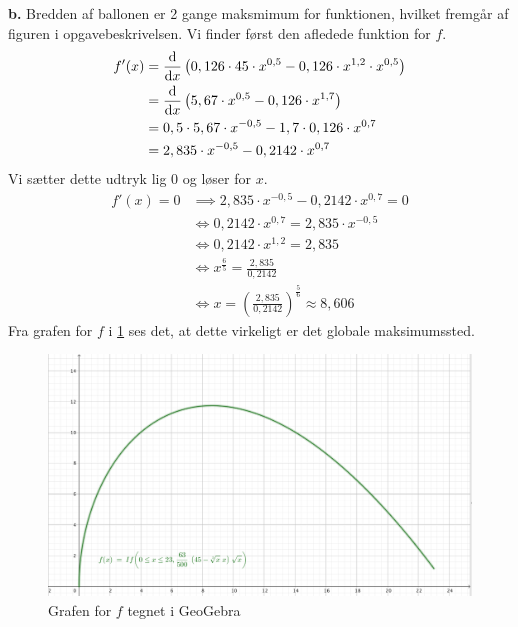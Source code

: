\documentclass{article}
\begin{document}
\noindent \textbf{b.}
Bredden af ballonen er 2 gange maksmimum for funktionen, hvilket fremgår af figuren i opgavebeskrivelsen.
Vi finder først den afledede funktion for $f$. 
\begin{equation*}
\begin{split}
  f'(x)&=\dv{x} \left(0,126 \cdot 45 \cdot x ^{0,5}-0,126 \cdot x ^{1,2} \cdot x ^{0,5}\right) \\
  &=\dv{x} \left(5,67 \cdot x ^{0,5}-0,126 \cdot x ^{1,7}\right) \\
  &=0,5 \cdot 5,67 \cdot x ^{-0,5} - 1,7 \cdot 0,126 \cdot x ^{0,7} \\
  &=2,835 \cdot x ^{-0,5} - 0,2142 \cdot x ^{0,7}
\end{split}
\end{equation*}
Vi sætter dette udtryk lig 0 og løser for $x$.
\begin{equation*}
\begin{split}
  f'(x)= 0 &\implies 2,835 \cdot x ^{-0,5} - 0,2142 \cdot x ^{0,7}=0\\
  &\iff 0,2142 \cdot x ^{0,7}=2,835 \cdot x ^{-0,5}\\
  &\iff 0,2142 \cdot x ^{1,2}=2,835\\
  &\iff x ^{\frac{6}{5}}=\frac{2,835}{0,2142}\\
  &\iff x=\left(\frac{2,835}{0,2142}\right) ^{\frac{5}{6}} \approx 8,606
\end{split}
\end{equation*}
Fra grafen for $f$ i \cref{fig:graf} ses det, at dette virkeligt er det globale maksimumssted. 
\begin{figure}[H]
\begin{center}
  \includegraphics[scale=0.4]{graf.png}
\end{center}
\caption{Grafen for $f$ tegnet i GeoGebra }
\label{fig:graf}
\end{figure}
\end{document}
